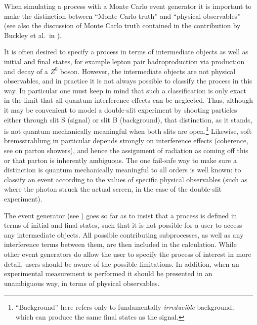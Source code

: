\label{sec:phys-obj-mc-truth}

When simulating a process with a Monte Carlo event generator it is
important to make the distinction between ``Monte Carlo truth'' and
``physical observables'' (see also the discussion of Monte Carlo truth
contained in the contribution by Buckley et al.\ in \cite{Butterworth:2010ym}).

It is often desired to specify a process in terms of intermediate
objects as well as initial and final states, for example lepton
pair hadroproduction via production and decay of a $Z^0$ boson. However,
the intermediate objects are not physical observables,
and in practice it is not always possible to classify the process in
this way.
In particular one must keep in mind that such a classification is only exact in the
limit that all quantum interference effects can be neglected.
Thus, although it may be convenient to model a
double-slit experiment by shooting particles either through slit S
(signal) or slit B (background), that distinction, as it stands, is not  quantum
mechanically meaningful when both slits are open.\footnote{``Background''
here refers only to fundamentally {\it irreducible} background, which
can produce the same final states as the signal.} Likewise, soft
bremsstrahlung in particular depends strongly on interference effects
(coherence, see  on parton showers),
and hence the assignment of radiation as coming off this or that
parton is inherently ambiguous.
The one fail-safe way to make sure a distinction
is quantum mechanically meaningful to all orders is well known: to
classify an event according to the values of specific physical
observables (such as where the photon struck the
actual screen, in the case of the double-slit experiment).

The \Sherpa event generator (see ) goes so far as to insist that a process is
defined in terms of initial and final states, such that it is
not possible for a user to access any intermediate objects.
All possible contributing subprocesses, as well as any interference terms between
them, are then included in the calculation.
While other event generators do allow the user to specify the process
of interest in more detail, users should be aware of the possible limitations.
In addition, when an experimental measurement is  performed it should  be
presented in an unambiguous way, in terms of physical observables.









